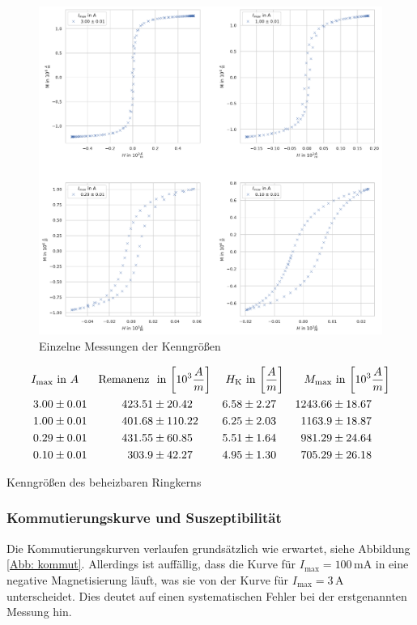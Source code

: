 \documentclass[12pt,a4paper]{scrartcl}
\numberwithin{equation}{section} %
\renewcommand{\[}{} %
\renewcommand{\]}{\noindent} %
\begin{document}
\begin{figure}
\centering
\includegraphics[scale=0.5]{../media/B2.4/3.3.1_single_measures.pdf}
\caption{Einzelne Messungen der Kenngrößen}
\label{Abb: heizbar kenngrößen}
\end{figure}

\begin{table}
	\begin{align*}
		I_\mathrm{max} &\text{ in } A &
		\text{Remanenz } &\text{ in }
		{\tiny \left[10^3  \frac{A}{m} \right] } &
		H_\mathrm{K} &\text{ in }
		{\tiny \left[ \frac{A}{m} \right] } &
		M_\mathrm{max} &\text{ in }
		{\tiny \left[10^3 \frac{A}{m} \right] }
		\\
		3.00 &\pm 0.01 &
		423.51 &\pm 20.42 &
		6.58 &\pm 2.27 &
		1243.66 &\pm 18.67
		\\
		1.00 &\pm 0.01 &
		401.68 &\pm 110.22 &
		6.25 &\pm 2.03 &
		1163.9 &\pm 18.87
		\\
		0.29 &\pm 0.01 &
		431.55 &\pm 60.85 &
		5.51 &\pm 1.64 &
		981.29 &\pm 24.64
		\\
		0.10 &\pm 0.01 &
		303.9 &\pm 42.27 &
		4.95 &\pm 1.30 &
		705.29 &\pm 26.18
	\end{align*}
	\caption{Kenngrößen des beheizbaren Ringkerns}
	\label{Tab: heizbar kenngrößen}
\end{table}

\hypertarget{kommutierungskurve-und-suszeptibilituxe4t}{%
\subsubsection{Kommutierungskurve und Suszeptibilität}\label{kommutierungskurve-und-suszeptibilituxe4t}}
Die Kommutierungskurven verlaufen grundsätzlich wie erwartet, siehe Abbildung \ref{Abb: kommut}. Allerdings ist auffällig, dass die Kurve für \(I_\mathrm{max}=100\mathrm{\,mA}\) in eine negative Magnetisierung läuft, was sie von der Kurve für \(I_\mathrm{max}= 3\,\mathrm A\) unterscheidet. Dies deutet auf einen systematischen Fehler bei der erstgenannten Messung hin.
\end{document}
